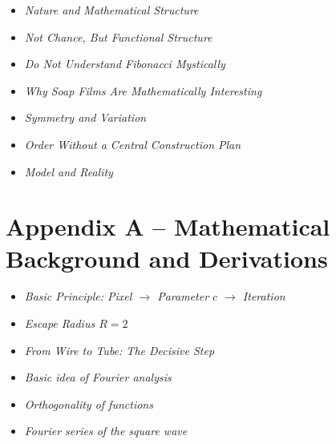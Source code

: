 \begin{DidacticBox}
	\begin{itemize}
		\item \emph{Nature and Mathematical Structure}\dotfill \pageref{box:nature-structure}
		\item \emph{Not Chance, But Functional Structure}\dotfill \pageref{box:branching-network}
		\item \emph{Do Not Understand Fibonacci Mystically}\dotfill \pageref{box:fibonacci-mystical}
		\item \emph{Why Soap Films Are Mathematically Interesting}\dotfill \pageref{box:soapfilm}
		\item \emph{Symmetry and Variation}\dotfill \pageref{box:symmetry-variation}
		\item \emph{Order Without a Central Construction Plan}\dotfill \pageref{box:selforganization}
		\item \emph{Model and Reality}\dotfill \pageref{box:model-reality}
	\end{itemize}
\end{DidacticBox}

\section{Appendix A -- Mathematical Background and Derivations}

\begin{MathBox}
	\begin{itemize}
		\item \emph{Basic Principle: Pixel \(\rightarrow\) Parameter \(c\) \(\rightarrow\) Iteration}\dotfill \pageref{box:mandelbrot-basic-principle}
		\item \emph{Escape Radius \(R=2\)}\dotfill \pageref{box:mandelbrot-escape-radius}
		\item \emph{From Wire to Tube: The Decisive Step}\dotfill \pageref{box:wire-tube}
		\item \emph{Basic idea of Fourier analysis}\dotfill \pageref{box:anhangA-fourier-grundidee}
		\item \emph{Orthogonality of functions}\dotfill \pageref{box:anhangA-fourier-orthogonalitaet}
		\item \emph{Fourier series of the square wave}\dotfill \pageref{box:anhangA-fourier-rechteckreihe}
	\end{itemize}
\end{MathBox}

